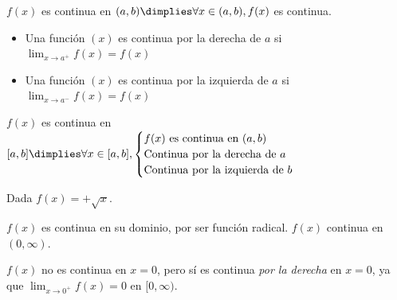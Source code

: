 \begin{defn}

	$f(x)$ es continua en $(a,b) \dimplies \forall x\in(a,b), f(x)$ es continua.
\end{defn}


\begin{defn}
	\begin{itemize}
		\item Una función $(x)$ es continua por la derecha de $a$ si $\displaystyle\lim_{x\to a^+}f(x) = f(x)$
		\item Una función $(x)$ es continua por la izquierda de $a$ si $\displaystyle\lim_{x\to a^-}f(x) = f(x)$
	\end{itemize}
\end{defn}

\begin{defn}

$f(x)$ es continua en $[a,b] \dimplies \forall x\in[a,b],\begin{cases} f(x) \text{ es continua en } (a,b)\\
\text{Continua por la derecha de } a\\
\text{Continua por la izquierda de } b\\\end{cases}$
\end{defn}


\begin{example}
Dada $f(x) = +\sqrt{x}$.

$f(x)$ es continua en su dominio, por ser función radical. $f(x)$ continua en $(0,\infty)$.

$f(x)$ no es continua en $x=0$, pero sí es continua \textit{por la derecha} en $x=0$, ya que $\displaystyle\lim_{x\to 0^+} f(x) = 0$ en $[0,\infty)$.
\end{example}


